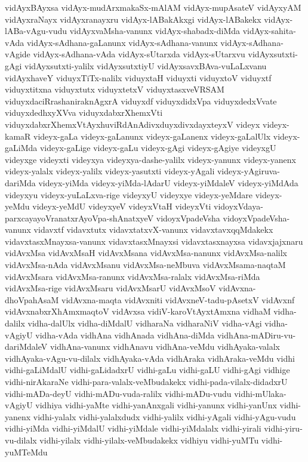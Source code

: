{vidAyxBAyxsa
vidAyx-mudArxmakaSx-mAlAM
vidAyx-mupAsateV
vidAyxyAM
vidAyxraNayx
vidAyxranayxru
vidAyx-lABakAkxgi
vidAyx-lABakekx
vidAyx-lABa-vAgu-vudu
vidAyxvaMsha-vanunx
vidAyx-shabadx-diMda
vidAyx-sahita-vAda
vidAyx-sAdhana-gaLanunx
vidAyx-sAdhana-vanunx
vidAyx-sAdhana-vAgide
vidAyx-sAdhana-vAda
vidAyx-sUtarxda
vidAyx-sUtarxvu
vidAyxsutxti-gAgi
vidAyxsutxti-yalilx
vidAyxsutxtiyU
vidAyxsavxBAva-vuLaLxvanu
vidAyxhaveY
viduyxTiTx-nalilx
viduyxtaH
viduyxti
viduyxtoV
viduyxtf
viduyxtitxna
viduyxtutx
viduyxtetxV
viduyxtasxveVRSAM
viduyxdaciRrashaniraknAgxrA
viduyxdf
viduyxdidxVpa
viduyxdedxVvate
viduyxdedhxyXVva
viduyxdabxrXhemxVti
viduyxdabxrXhemxVtAyxhuviRdAnAdivxduyxdivxdayxteyxV
videyx
videyx-kamaR
videyx-gaLa
videyx-gaLanunx
videyx-gaLanenx
videyx-gaLalUlx
videyx-gaLiMda
videyx-gaLige
videyx-gaLu
videyx-gAgi
videyx-gAgiye
videyxgU
videyxge
videyxti
videyxya
videyxya-dashe-yalilx
videyx-yanunx
videyx-yanenx
videyx-yalalx
videyx-yalilx
videyx-yasutxti
videyx-yAgali
videyx-yAgiruva-dariMda
videyx-yiMda
videyx-yiMda-lAdarU
videyx-yiMdaleV
videyx-yiMdAda
videyxyu
videyx-yuLaLxva-rige
videyxyU
videyxye
videyx-yeMdare
videyx-yeMdu
videyx-yeMdU
videyxyeV
videyxVtaH
videyxVti
vidoyxVdaya-parxcayayoVranatxrAyoVpa-shAnatxyeV
vidoyxVpadeVsha
vidoyxVpadeVsha-vanunx
vidavxtf
vidavxtutx
vidavxtatxvX-vanunx
vidavxtavxqqMdakekx
vidavxtasxMnayxsa-vanunx
vidavxtasxMnayxsi
vidavxtasxnayxsa
vidavxjajxnaru
vidAvxMsa
vidAvxMsaH
vidAvxMsana
vidAvxMsa-nanunx
vidAvxMsa-nalilx
vidAvxMsa-nAda
vidAvxMsanu
vidAvxMsa-neMbuva
vidAvxMsama-naqtaM
vidAvxMsara
vidAvxMsa-ranunx
vidAvxMsa-ralalx
vidAvxMsa-riMda
vidAvxMsa-rige
vidAvxMsaru
vidAvxMsarU
vidAvxMsoV
vidAvxna-dhoVpahAsaM
vidAvxna-maqta
vidAvxniti
vidAvxneV-tadu-pAsetxV
vidAvxnf
vidAvxnabxrXhAmxmaqtoV
vidAvxsa
vidiV-karoVtAyxtAmxna
vidhaM
vidha-dalilx
vidha-dalUlx
vidha-diMdalU
vidharaNa
vidharaNiV
vidha-vAgi
vidha-vAgiyU
vidha-vAda
vidhAna
vidhAnada
vidhAna-diMda
vidhAna-mADiru-vu-dariMdaleV
vidhAna-vanunx
vidhAnavu
vidhAna-veMdu
vidhAyaka-valalx
vidhAyaka-vAgu-vu-dilalx
vidhAyaka-vAda
vidhAraka
vidhAraka-veMdu
vidhi
vidhi-gaLiMdalU
vidhi-gaLidadxrU
vidhi-gaLu
vidhi-gaLU
vidhi-gAgi
vidhige
vidhi-nirAkaraNe
vidhi-para-valalx-veMbudakekx
vidhi-pada-vilalx-didadxrU
vidhi-mADa-deyU
vidhi-mADu-vuda-ralilx
vidhi-mADu-vudu
vidhi-mUlaka-vAgiyU
vidhiya
vidhi-yaMte
vidhi-yanAnxgali
vidhi-yanunx
vidhi-yanUnx
vidhi-yanenx
vidhi-yalalx
vidhi-yalalxdudx
vidhi-yalilx
vidhi-yAgali
vidhi-yAgu-vudu
vidhi-yiMda
vidhi-yiMdalU
vidhi-yiMdale
vidhi-yiMdalalx
vidhi-yirali
vidhi-yiru-vu-dilalx
vidhi-yilalx
vidhi-yilalx-veMbudakekx
vidhiyu
vidhi-yuMTu
vidhi-yuMTeMdu
}
